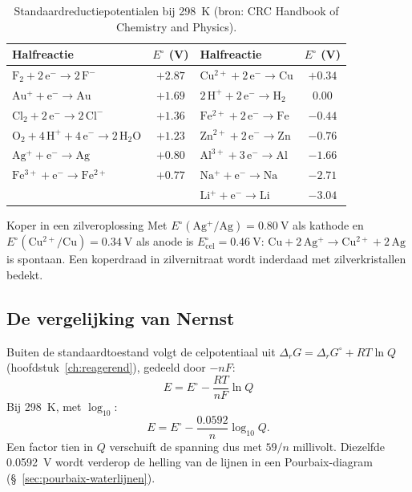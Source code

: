 \begin{table}[htb]
\centering
\small
\begin{tabular}{lc@{\qquad}lc}
\toprule
Halfreactie & $E^\circ$ (V) & Halfreactie & $E^\circ$ (V) \\
\midrule
$\mathrm{F_2 + 2\,e^- \rightarrow 2\,F^-}$ & $+2.87$ & $\mathrm{Cu^{2+} + 2\,e^- \rightarrow Cu}$ & $+0.34$ \\
$\mathrm{Au^+ + e^- \rightarrow Au}$ & $+1.69$ & $\mathrm{2\,H^+ + 2\,e^- \rightarrow H_2}$ & $0.00$ \\
$\mathrm{Cl_2 + 2\,e^- \rightarrow 2\,Cl^-}$ & $+1.36$ & $\mathrm{Fe^{2+} + 2\,e^- \rightarrow Fe}$ & $-0.44$ \\
$\mathrm{O_2 + 4\,H^+ + 4\,e^- \rightarrow 2\,H_2O}$ & $+1.23$ & $\mathrm{Zn^{2+} + 2\,e^- \rightarrow Zn}$ & $-0.76$ \\
$\mathrm{Ag^+ + e^- \rightarrow Ag}$ & $+0.80$ & $\mathrm{Al^{3+} + 3\,e^- \rightarrow Al}$ & $-1.66$ \\
$\mathrm{Fe^{3+} + e^- \rightarrow Fe^{2+}}$ & $+0.77$ & $\mathrm{Na^+ + e^- \rightarrow Na}$ & $-2.71$ \\
 & & $\mathrm{Li^+ + e^- \rightarrow Li}$ & $-3.04$ \\
\bottomrule
\end{tabular}
\caption{Standaardreductiepotentialen bij \SI{298}{\kelvin} (bron: CRC Handbook of Chemistry and Physics).}
\label{tab:reductiepotentialen}
\end{table}

\begin{voorbeeld}{Koper in een zilveroplossing}
Met $E^\circ(\mathrm{Ag^+/Ag}) = \SI{0.80}{\volt}$ als kathode en $E^\circ(\mathrm{Cu^{2+}/Cu}) = \SI{0.34}{\volt}$ als anode is $E^\circ_\text{cel} = \SI{0.46}{\volt}$: $\mathrm{Cu + 2\,Ag^+ \rightarrow Cu^{2+} + 2\,Ag}$ is spontaan. Een koperdraad in zilvernitraat wordt inderdaad met zilverkristallen bedekt.
\end{voorbeeld}

\subsection{De vergelijking van Nernst}
\label{sec:nernst-elektrochemie}

Buiten de standaardtoestand volgt de celpotentiaal uit $\Delta_r G = \Delta_r G^\circ + RT \ln Q$ (hoofdstuk~\ref{ch:reagerend}), gedeeld door $-nF$:
\begin{equation}
\boxed{\;E = E^\circ - \frac{RT}{nF} \ln Q\;}
\label{eq:nernst}
\end{equation}
Bij \SI{298}{\kelvin}, met $\log_{10}$:
\begin{equation}
E = E^\circ - \frac{0.0592}{n} \log_{10} Q.
\label{eq:nernst-log10}
\end{equation}
Een factor tien in $Q$ verschuift de spanning dus met $59/n$ millivolt. Diezelfde \SI{0.0592}{\volt} wordt verderop de helling van de lijnen in een Pourbaix-diagram (\S~\ref{sec:pourbaix-waterlijnen}).

